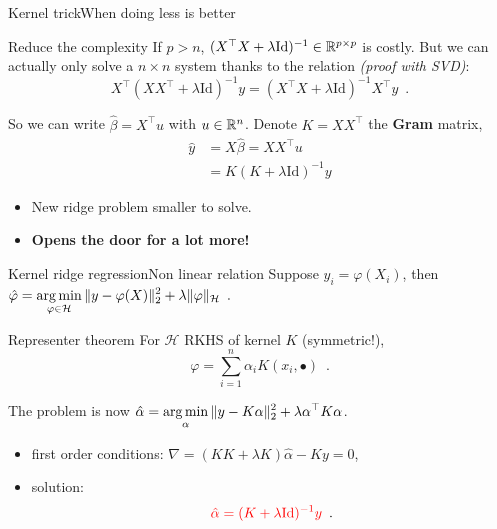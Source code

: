 \documentclass[10pt,aspectratio=43]{beamer}
\begin{document}
\begin{frame}{Kernel trick}{When doing less is better}
    \begin{block}{Reduce the complexity}
        If $p>n$, $(X^\top X + \lambda \mathrm{Id})^{-1}\in\mathbb{R}^{p\times p}$ is costly.
        But we can actually only solve a $n\times n$ system thanks to the relation \emph{(proof with SVD)}:
        \[X^\top (X X^\top + \lambda \mathrm{Id})^{-1}y = (X^\top X + \lambda \mathrm{Id})^{-1}X^\top y\enspace.\]
    \end{block}
    \pause
    So we can write $\hat \beta = X^\top u$ with $u\in\mathbb{R}^{n}$. Denote $K=XX^\top$ the \textbf{Gram} matrix,
    \begin{align*}
        \hat y &= X\hat\beta = XX^\top u \\
               &= K(K + \lambda \mathrm{Id})^{-1}y
    \end{align*}

    \begin{itemize}
        \item New ridge problem smaller to solve.
        \item \textbf{Opens the door for a lot more!}
    \end{itemize}
\end{frame}

\begin{frame}{Kernel ridge regression}{Non linear relation}
Suppose $y_i=\varphi(X_i)$, then
 $\hat\varphi = \displaystyle\mathop{\mathrm{arg\,min}}_{\varphi\in\mathcal{H}} \|y-\varphi(X)\|^2_2 + \lambda \|\varphi\|_\mathcal{H}\enspace.$
 \begin{block}{Representer theorem}
        For $\mathcal{H}$ RKHS of kernel $K$ (symmetric!),
     \[\varphi = \sum_{i=1}^n \alpha_i K(x_i, \bullet)\enspace.\]
 \end{block}
 \pause
 The problem is now $\hat\alpha = \displaystyle\mathop{\mathrm{arg\,min}}_{\alpha} \|y-K\alpha\|^2_2 + \lambda \alpha^\top K \alpha$.
 \begin{itemize}
     \item first order conditions: $\nabla=(KK + \lambda K)\hat\alpha - Ky = 0$,
     \item solution: \[\textcolor{red}{\hat\alpha = (K+\lambda\mathrm{Id})^{-1}y} \enspace.\]
 \end{itemize}
\end{frame}
\end{document}
